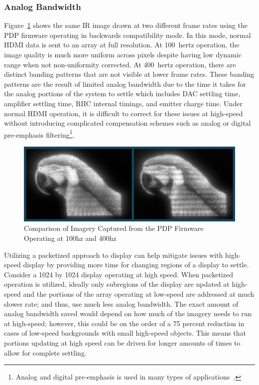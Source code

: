         \subsubsection{Analog Bandwidth}
            \label{sec:analog_bandwidth}
            Figure~\ref{fig:pdp_bird_comparison} shows the same IR image drawn at two different frame rates using the PDP firmware operating in backwards compatibility mode. In this mode, normal HDMI data is sent to an array at full resolution. At \mbox{100 hertz} operation, the image quality is much more uniform across pixels despite having low dynamic range when not non-uniformity corrected. At \mbox{400 hertz} operation, there are distinct banding patterns that are not visible at lower frame rates. These banding patterns are the result of limited analog bandwidth due to the time it takes for the analog portions of the system to settle which includes DAC settling time, amplifier settling time, RIIC internal timings, and emitter charge time. Under normal HDMI operation, it is difficult to correct for these issues at high-speed without introducing complicated compensation schemes such as analog or digital pre-emphasis filtering\footnote{Analog and digital pre-emphasis is used in many types of applications~\cite{BuckwalterEtAl2006, RafiqueEtAl2015, HuEtAl2017, ThaiEtAl2018, ZhouEtAl2020}.}.

            \begin{figure}[t]
                \centering
                \includegraphics[width=1.0\textwidth]{fig/pdp_bird_comparison.png}
                \caption{Comparison of Imagery Captured from the PDP Firmware Operating at 100hz and 400hz}
                \label{fig:pdp_bird_comparison}
            \end{figure}

            Utilizing a packetized approach to display can help mitigate issues with high-speed display by providing more time for changing regions of a display to settle. Consider a 1024 by 1024 display operating at high speed. When packetized operation is utilized, ideally only subregions of the display are updated at high-speed and the portions of the array operating at low-speed are addressed at much slower rate; and thus, use much less analog bandwidth. The exact amount of analog bandwidth saved would depend on how much of the imagery needs to run at high-speed; however, this could be on the order of a 75 percent reduction in cases of low-speed backgrounds with small high-speed objects. This means that portions updating at high speed can be driven for longer amounts of times to allow for complete settling.
